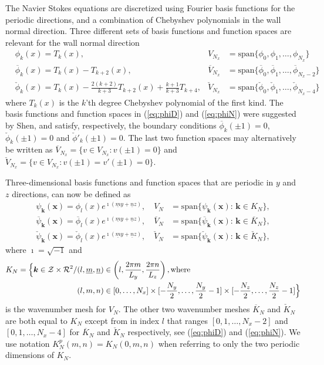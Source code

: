\documentclass[11pt, oneside]{article}
\newcommand{\N}[1]{\check{#1}}
\newcommand{\D}[1]{\overline{#1}}
\begin{document}
The Navier Stokes equations are discretized using Fourier basis functions for the periodic directions, and a combination of Chebyshev polynomials in the wall normal direction. Three different sets of basis functions and function spaces are relevant for the wall normal direction
\begin{align}
&  \phi_k(x) = T_k(x), & V_{N_x} &= \text{span}\{\phi_0, \phi_1,\ldots, \phi_{N_x}\} \label{eq:Tk}\\
& \D{\phi}_k(x) = T_k(x) - T_{k+2}(x), & \D{V}_{N_x} &= \text{span} \{ \D{\phi}_0, \D{\phi}_1, \ldots, \D{\phi}_{N_x-2} \} \label{eq:phiD}\\
& \N{\phi}_k(x) = T_k(x) - \frac{2(k+2)}{k+3} T_{k+2}(x) + 
\frac{k+1}{k+3} T_{k+4}, & \N{V}_{N_x} &= \text{span} \{\N{\phi}_0, \N{\phi}_1, 
\ldots, \N{\phi}_{N_x-4} \} \label{eq:phiN} 
\end{align}
where $T_k(x)$ is the $k$'th degree Chebyshev polynomial of the first kind. The 
basis functions and function spaces in (\ref{eq:phiD}) and (\ref{eq:phiN}) were 
suggested by Shen, and satisfy, respectively, the boundary conditions 
$\D{\phi}_k(\pm 1) = 0$, $\N{\phi}_k(\pm 1)=0$ and $\N{\phi}'_k(\pm 1)=0$. The 
last two function spaces may alternatively be written as $\D{V}_{N_x} = \{v \in 
V_{N_x}: v(\pm 1)=0 \}$ and $\N{V}_{N_x} = \{v \in V_{N_x}: v(\pm 1) = v'(\pm 
1) = 0 \}$.  

Three-dimensional basis functions and function spaces that are periodic in $y$ 
and $z$ directions, can now be defined as
\begin{align}
  \psi_{\bm{k}}(\bm{x}) = \phi_{l}(x)e^{ \imath(\underline{m} y + \underline{n} z)}, \quad V_N &= \text{span} \{ \psi_{\bm{k}}(\bm{x}):\, \bm{k} \in K_N  \}, \\
  \D{\psi}_{\bm{k}}(\bm{x}) = \D{\phi}_{l}(x)e^{ \imath(\underline{m} y + \underline{n} z)}, \quad \D{V}_N &= \text{span} \{ \D{\psi}_{\bm{k}}(\bm{x}):\, \bm{k} \in \D{K}_N  \}, \\
  \N{\psi}_{\bm{k}}(\bm{x}) = \N{\phi}_{l}(x)e^{ \imath(\underline{m} y + \underline{n} z)}, \quad \N{V}_N &= \text{span} \{ \N{\psi}_{\bm{k}}(\bm{x}):\, \bm{k} \in \N{K}_N  \},
\end{align}
where $\imath=\sqrt{-1}$ and 
\begin{align}
K_N = \Big\{\bm{k} \in \mathcal{Z}\times\mathcal{R}^2 / &(l, \underline{m}, \underline{n}) \in \left( l, \frac{2 \pi m}{L_y}, \frac{2 \pi n}{L_z} \right), \text{where} \notag \\
 &(l, m, n) \in  [0, \ldots, N_x] \times [-\frac{N_y}{2},\ldots, 
 \frac{N_y}{2}-1] \times[-\frac{N_z}{2},\ldots, \frac{N_z}{2}-1] \Big\} 
 \label{eq:wavenumbermesh}
\end{align}
is the wavenumber mesh for $V_N$. The other two wavenumber meshes $\D{K}_N$ and 
$\N{K}_N$ are both equal to $K_N$ except from in index $l$ that 
ranges $[0, 1, \ldots, N_x-2]$ and $[0, 1, \ldots, N_x-4]$ for $\D{K}_N$ 
and $\N{K}_N$ respectively, see (\ref{eq:phiD}) and (\ref{eq:phiN}). We use 
notation $K_N^p(m, n)=K_N(0, m, n)$ when referring to only the two periodic 
dimensions of $K_N$.
\end{document}
